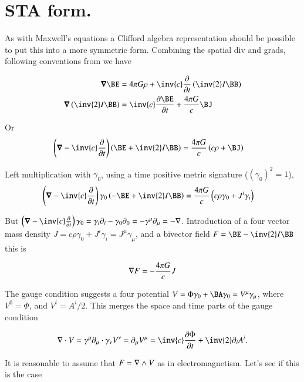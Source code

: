 \section{STA form. }

As with Maxwell's equations a Clifford algebra representation should be possible to put this into a more symmetric form.  Combining the spatial div and grads, following conventions from \cite{doran2003gap} we have

\begin{align}
\spacegrad \BE &= 4 \pi G \rho + \inv{c} \PD{t}{}\left(\inv{2}I \BB\right) \\
\spacegrad \left( \inv{2} I \BB \right) &= \inv{c} \PD{t}{\BE} + \frac{4\pi G}{c}\BJ
\end{align}

Or
\begin{align}
\left( \spacegrad -\inv{c} \PD{t}{}\right) \left( \BE + \inv{2} I \BB \right) &= \frac{4\pi G}{c} \left( c \rho + \BJ \right)
\end{align}

Left multiplication with $\gamma_0$, using a time positive metric signature ($(\gamma_0)^2=1$), 
\begin{align}
\left( \spacegrad -\inv{c} \PD{t}{}\right) \gamma_0 \left( -\BE + \inv{2} I \BB \right) &= \frac{4\pi G}{c} \left( c \rho \gamma_0 + J^i \gamma_i \right)
\end{align}

But $\left( \spacegrad -\inv{c} \PD{t}{}\right) \gamma_0 = \gamma_i \partial_i - \gamma_0 \partial_0 = -\gamma^\mu \partial_\mu = -\grad$.  Introduction of a four vector mass density $J = c\rho \gamma_0 + J^i \gamma_i = J^\mu \gamma_\mu$, and a bivector field $F = \BE -\inv{2} I \BB$ this is

\begin{align}
\nabla F = -\frac{4\pi G}{c} J
\end{align}

The gauge condition suggests a four potential $V = \Phi \gamma_0 + \BA \gamma_0 = V^\mu \gamma_\mu$, where $V^0 = \Phi$, and $V^i = A^i/2$.  This merges the
space and time parts of the gauge condition

\begin{align*}
\grad \cdot V = \gamma^\mu \partial_\mu \cdot \gamma_\nu V^\nu = \partial_\mu V^\mu = \inv{c}\PD{t}{\Phi} + \inv{2}\partial_i A^i.
\end{align*}

It is reasonable to assume that $F = \nabla \wedge V$ as in electromagnetism.  Let's see if this is the case

